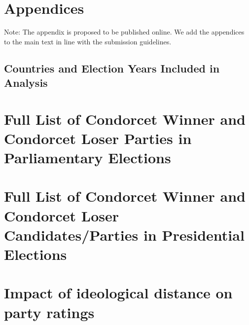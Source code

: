 \documentclass[12pt]{scrartcl}
\begin{document}
\newpage 
\singlespacing
%


%

\appendix
\section*{Appendices}

Note: The appendix is  proposed to be published online. We add the appendices to the main text in line with the submission guidelines. 

\singlespacing
\newpage
\begin{landscape}
\section{Countries and Election Years Included in Analysis}

\end{landscape}
	
\section{Full List of Condorcet Winner and Condorcet Loser Parties in Parliamentary Elections}
%	
	
\section{Full List of Condorcet Winner and Condorcet Loser Candidates/Parties in Presidential Elections}

%

\newpage
\section{Impact of ideological distance on party ratings}\label{app.IdeolDist}

\renewcommand{\thetable}{D} 


\end{document}
